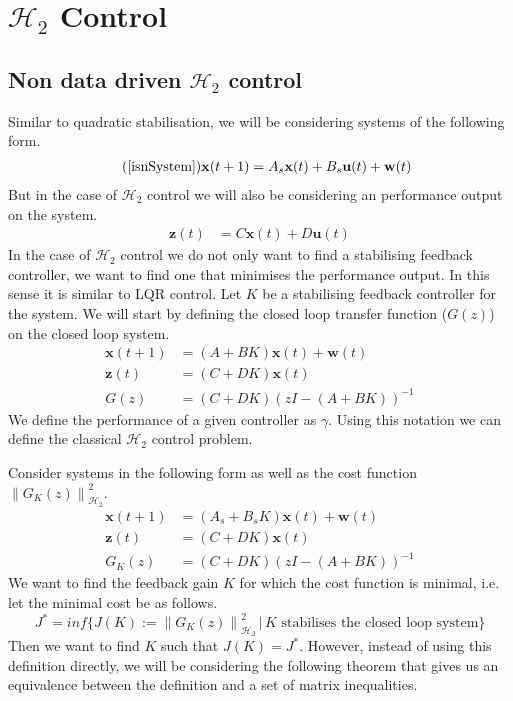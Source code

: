 \section{$\mathcal{H}_2$ Control}


\subsection{Non data driven $\mathcal{H}_2$ control}
Similar to quadratic stabilisation, we will be considering systems of the following form.
\begin{align} \tag{\ref{isnSystem}}
\mathbf{x}(t+1) &= A_s \mathbf{x}(t) + B_s \mathbf{u}(t) + \mathbf{w}(t)
\end{align}
But in the case of $\mathcal{H}_2$ control we will also be considering an performance output on the system.
\begin{align*}
	\mathbf{z}(t) &= C \mathbf{x}(t) + D \mathbf{u}(t)
\end{align*}
In the case of $\mathcal{H}_2$ control we do not only want to find a stabilising feedback controller, we want to find one that minimises the performance output. In this sense it is similar to LQR control. Let $K$ be a stabilising feedback controller for the system. We will start by defining the closed loop transfer function ($G(z)$) on the closed loop system.
\begin{align*}
	\mathbf{x}(t+1) &= (A + B K) \mathbf{x}(t) + \mathbf{w}(t) \\
	\mathbf{z}(t)   &= (C   + D   K) \mathbf{x}(t) \\
	G(z) &= (C + DK)(z I - (A+BK))^{-1}
\end{align*}
We define the performance of a given controller as $\gamma$. Using this notation we can define the classical $\mathcal{H}_2$ control problem.

\cite[Problem 11.1]{bookTrentelman} Consider systems in the following form as well as the cost function $\left\| G_K(z) \right\|^2_{\mathcal{H}_2}$.
\begin{align*}
	\mathbf{x}(t+1) &= (A_s + B_s K) \mathbf{x}(t) + \mathbf{w}(t) \\
	\mathbf{z}(t)   &= (C   + D   K) \mathbf{x}(t) \\
	G_K(z) &= (C + DK)(z I - (A+BK))^{-1}
\end{align*}
We want to find the feedback gain $K$ for which the cost function is minimal, i.e. let the minimal cost be as follows.
\begin{equation*}
	J^\ast = inf \{ J(K) := \left\| G_K(z) \right\|^2_{\mathcal{H}_2} \, | \, K \mbox{ stabilises the closed loop system}\}
\end{equation*}
Then we want to find $K$ such that $J(K) = J^\ast$. However, instead of using this definition directly, we will be considering the following theorem that gives us an equivalence between the definition and a set of matrix inequalities.

